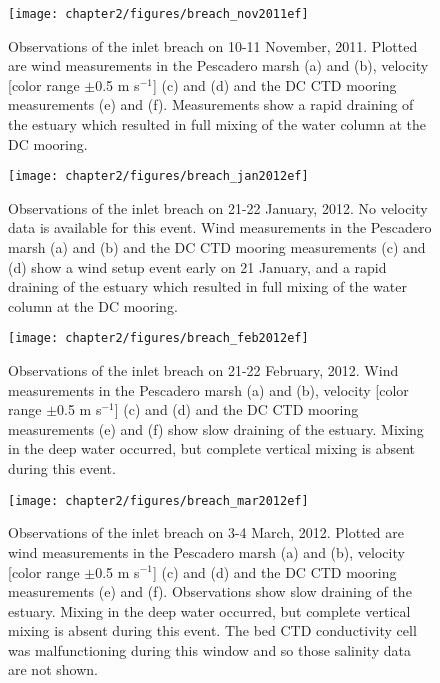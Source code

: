 \begin{figure}[p]
	\texttt{[image: chapter2/figures/breach\_nov2011ef]} \caption{Observations of the inlet breach on 10-11 November, 2011. Plotted are wind measurements in the Pescadero marsh (a) and (b), velocity [color range $\pm$0.5 m s$^{-1}$] (c) and (d) and the DC CTD mooring measurements (e) and (f). Measurements show a rapid draining of the estuary which resulted in full mixing of the water column at the DC mooring.} \label{fig:breach_nov2011}
\end{figure}

\begin{figure}[p]
	\centering
	\texttt{[image: chapter2/figures/breach\_jan2012ef]} 
	\caption{Observations of the inlet breach on 21-22 January, 2012. No velocity data is available for this event. Wind measurements in the Pescadero marsh (a) and (b) and the DC CTD mooring measurements (c) and (d) show a wind setup event early on 21 January, and a rapid draining of the estuary which resulted in full mixing of the water column at the DC mooring.} \label{fig:breach_jan2012}
\end{figure}

\begin{figure}[p]
	\centering
	\texttt{[image: chapter2/figures/breach\_feb2012ef]} 
	\caption{Observations of the inlet breach on 21-22 February, 2012. Wind measurements in the Pescadero marsh (a) and (b), velocity [color range $\pm$0.5 m s$^{-1}$] (c) and (d) and the DC CTD mooring measurements (e) and (f) show slow draining of the estuary. Mixing in the deep water occurred, but complete vertical mixing is absent during this event.} \label{fig:breach_feb2012}
\end{figure}


\begin{figure}[p]
	\centering
	\texttt{[image: chapter2/figures/breach\_mar2012ef]} 
	\caption{Observations of the inlet breach on 3-4 March, 2012. Plotted are wind measurements in the Pescadero marsh (a) and (b), velocity [color range $\pm$0.5 m s$^{-1}$] (c) and (d) and the DC CTD mooring measurements (e) and (f). Observations show slow draining of the estuary. Mixing in the deep water occurred, but complete vertical mixing is absent during this event. The bed CTD conductivity cell was malfunctioning during this window and so those salinity data are not shown.} \label{fig:breach_mar2012}
\end{figure}


